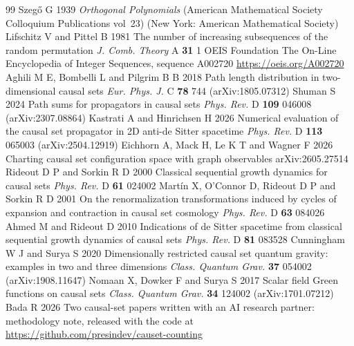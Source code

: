 \documentclass[12pt]{iopart}
\begin{document}
\begin{thebibliography}{99}
 Szeg\H{o} G 1939 {\it Orthogonal Polynomials} (American Mathematical Society Colloquium Publications vol~23) (New York: American Mathematical Society)
 Lifschitz V and Pittel B 1981 The number of increasing subsequences of the random permutation {\it J. Comb. Theory} A {\bf 31} 1
 OEIS Foundation The On-Line Encyclopedia of Integer Sequences, sequence A002720 \url{https://oeis.org/A002720}
 Aghili M E, Bombelli L and Pilgrim B B 2018 Path length distribution in two-dimensional causal sets {\it Eur. Phys. J.} C {\bf 78} 744 (arXiv:1805.07312)
 Shuman S 2024 Path sums for propagators in causal sets {\it Phys. Rev.} D {\bf 109} 046008 (arXiv:2307.08864)
 Kastrati A and Hinrichsen H 2026 Numerical evaluation of the causal set propagator in 2D anti-de Sitter spacetime {\it Phys. Rev.} D {\bf 113} 065003 (arXiv:2504.12919)
 Eichhorn A, Mack H, Le K T and Wagner F 2026 Charting causal set configuration space with graph observables arXiv:2605.27514
 Rideout D P and Sorkin R D 2000 Classical sequential growth dynamics for causal sets {\it Phys. Rev.} D {\bf 61} 024002
 Mart\'in X, O'Connor D, Rideout D P and Sorkin R D 2001 On the renormalization transformations induced by cycles of expansion and contraction in causal set cosmology {\it Phys. Rev.} D {\bf 63} 084026
 Ahmed M and Rideout D 2010 Indications of de Sitter spacetime from classical sequential growth dynamics of causal sets {\it Phys. Rev.} D {\bf 81} 083528
 Cunningham W J and Surya S 2020 Dimensionally restricted causal set quantum gravity: examples in two and three dimensions {\it Class. Quantum Grav.} {\bf 37} 054002 (arXiv:1908.11647)
 Nomaan X, Dowker F and Surya S 2017 Scalar field Green functions on causal sets {\it Class. Quantum Grav.} {\bf 34} 124002 (arXiv:1701.07212)
 Bada R 2026 Two causal-set papers written with an AI research partner: methodology note, released with the code at \url{https://github.com/presindev/causet-counting}
\end{thebibliography}
\end{document}
